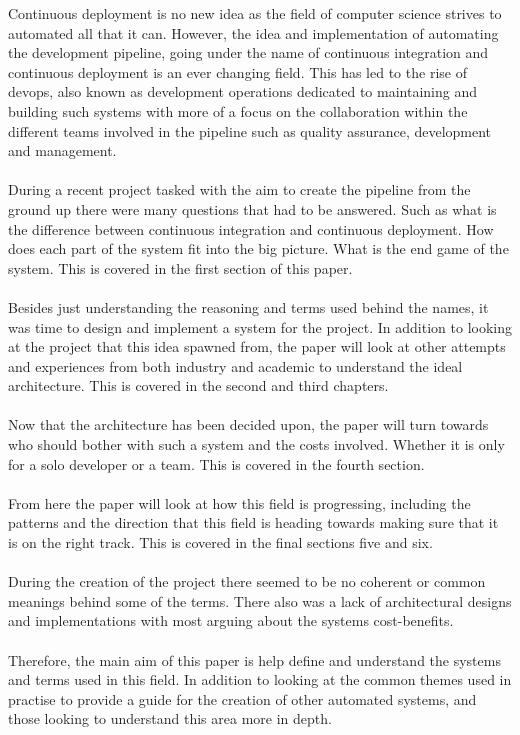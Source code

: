 Continuous deployment is no new idea as the field of computer science strives to automated all that it can. However, the idea and implementation of automating the development pipeline, going under the name of continuous integration and continuous deployment is an ever changing field. This has led to the rise of devops, also known as development operations dedicated to maintaining and building such systems with more of a focus on the collaboration within the different teams involved in the pipeline such as quality assurance, development and management.
\\\\
During a recent project tasked with the aim to create the pipeline from the ground up there were many questions that had to be answered. Such as what is the difference between continuous integration and continuous deployment. How does each part of the system fit into the big picture. What is the end game of the system. This is covered in the first section of this paper.
\\\\
Besides just understanding the reasoning and terms used behind the names, it was time to design and implement a system for the project. In addition to looking at the project that this idea spawned from, the paper will look at other attempts and experiences from both industry and academic to understand the ideal architecture. This is covered in the second and third chapters.
\\\\
Now that the architecture has been decided upon, the paper will turn towards who should bother with such a system and the costs involved. Whether it is only for a solo developer or a team. This is covered in the fourth section.
\\\\
From here the paper will look at how this field is progressing, including the patterns and the direction that this field is heading towards making sure that it is on the right track. This is covered in the final sections five and six.
\\\\
During the creation of the project there seemed to be no coherent or common meanings behind some of the terms. There also was a lack of architectural designs and implementations with most arguing about the systems cost-benefits.
\\\\
Therefore, the main aim of this paper is help define and understand the systems and terms used in this field. In addition to looking at the common themes used in practise to provide a guide for the creation of other automated systems, and those looking to understand this area more in depth.
